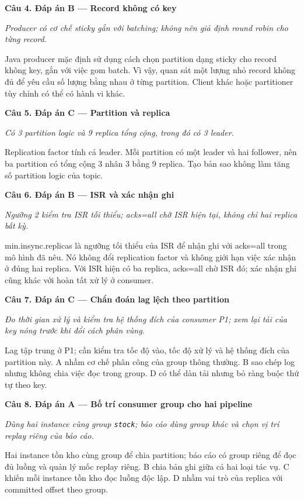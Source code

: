 \noindent\textbf{Câu 4. Đáp án B --- Record không có key}\par
\noindent\emph{Producer có cơ chế sticky gắn với batching; không nên giả định round robin cho từng record.}\par
Java producer mặc định sử dụng cách chọn partition dạng sticky cho record không key, gắn với việc gom batch. Vì vậy, quan sát một lượng nhỏ record không đủ để yêu cầu số lượng bằng nhau ở từng partition. Client khác hoặc partitioner tùy chỉnh có thể có hành vi khác.\par\addvspace{0.8em}

\noindent\textbf{Câu 5. Đáp án C --- Partition và replica}\par
\noindent\emph{Có 3 partition logic và 9 replica tổng cộng, trong đó có 3 leader.}\par
Replication factor tính cả leader. Mỗi partition có một leader và hai follower, nên ba partition có tổng cộng 3 nhân 3 bằng 9 replica. Tạo bản sao không làm tăng số partition logic của topic.\par\addvspace{0.8em}

\noindent\textbf{Câu 6. Đáp án B --- ISR và xác nhận ghi}\par
\noindent\emph{Ngưỡng 2 kiểm tra ISR tối thiểu; acks=all chờ ISR hiện tại, không chỉ hai replica bất kỳ.}\par
min.insync.replicas là ngưỡng tối thiểu của ISR để nhận ghi với acks=all trong mô hình đã nêu. Nó không đổi replication factor và không giới hạn việc xác nhận ở đúng hai replica. Với ISR hiện có ba replica, acks=all chờ ISR đó; xác nhận ghi cũng khác với hoàn tất xử lý ở consumer.\par\addvspace{0.8em}

\noindent\textbf{Câu 7. Đáp án C --- Chẩn đoán lag lệch theo partition}\par
\noindent\emph{Đo thời gian xử lý và kiểm tra hệ thống đích của consumer P1; xem lại tải của key nóng trước khi đổi cách phân vùng.}\par
Lag tập trung ở P1; cần kiểm tra tốc độ vào, tốc độ xử lý và hệ thống đích của partition này. A nhầm cơ chế phân công của group thông thường. B sao chép log nhưng không chia việc đọc trong group. D có thể dàn tải nhưng bỏ ràng buộc thứ tự theo key.\par\addvspace{0.8em}

\noindent\textbf{Câu 8. Đáp án A --- Bố trí consumer group cho hai pipeline}\par
\noindent\emph{Dùng hai instance cùng group \texttt{stock}; báo cáo dùng group khác và chọn vị trí replay riêng của báo cáo.}\par
Hai instance tồn kho cùng group để chia partition; báo cáo có group riêng để đọc đủ luồng và quản lý mốc replay riêng. B chia bản ghi giữa cả hai loại tác vụ. C khiến mỗi instance tồn kho đọc luồng độc lập. D nhầm vai trò của replica với committed offset theo group.\par\addvspace{0.8em}

